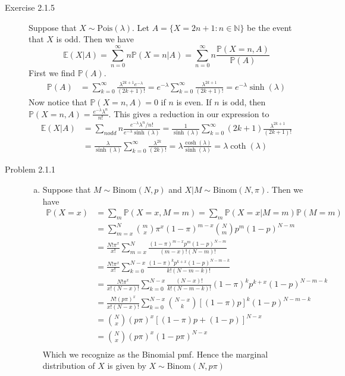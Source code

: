 \documentclass[12pt]{article}  %
\newcommand{\N}{{\mathbb{N}}}
\newcommand{\E}{{\mathbb{E}}}
\newcommand{\prob}{{\mathbb{P}}}
\begin{document}
\begin{description}
\item[Exercise 2.1.5] Suppose that $X\sim\text{Pois}(\lambda)$. Let $A = \{X = 2n+1: n\in\N\}$ be the event that $X$ is odd. Then we have $$\E(X|A) = \sum_{n=0}^{\infty}n\prob(X = n|A) = \sum_{n= 0}^{\infty}n\frac{\prob(X = n, A)}{\prob(A)}$$ First we find $\prob(A)$. 
\begin{align*}
\prob(A) &= \sum_{k=0}^{\infty}\frac{\lambda^{2k+1}e^{-\lambda}}{(2k+1)!} = e^{-\lambda}\sum_{k=0}
^{\infty}\frac{\lambda^{2k+1}}{(2k+1)!} = e^{-\lambda}\sinh(\lambda)
\end{align*}
Now notice that $\prob(X = n, A) = 0$ if $n$ is even. If $n$ is odd, then $\prob(X = n, A) = \frac{e^{-\lambda}\lambda^n}{n!}$. This gives a reduction in our expression to 
\begin{align*}
\E(X|A) &= \sum_{n odd}n\frac{e^{-\lambda}\lambda^n/n!}{e^{-\lambda}\sinh(\lambda)} = \frac{1}{\sinh(\lambda)}\sum_{k=0}^{\infty}(2k+1)\frac{\lambda^{2k+1}}{(2k+1)!}\\ 
&= \frac{\lambda}{\sinh(\lambda)}\sum_{k=0}^{\infty}\frac{\lambda^{2k}}{(2k)!} = \lambda\frac{\cosh(\lambda)}{\sinh(\lambda)} = \lambda\coth(\lambda)
\end{align*}

\item[Problem 2.1.1] 
\begin{enumerate}[(a)]
\item Suppose that $M\sim\text{Binom}(N,p)$ and $X|M\sim\text{Binom}(N,\pi)$. Then we have 
\begin{align*}
\prob(X = x) &= \sum_{m}\prob(X=x, M=m) = \sum_{m}\prob(X=x|M=m)\prob(M=m)\\
&= \sum_{m=x}^{N}\binom{m}{x}\pi^{x}(1-\pi)^{m-x}\binom{N}{m}p^m(1-p)^{N-m}\\ 
&= \frac{N!\pi^{x}}{x!}\sum_{m=x}^{N}\frac{(1-\pi)^{m-x}p^m(1-p)^{N-m}}{(m-x)!(N-m)!}\\
&= \frac{N!\pi^{x}}{x!}\sum_{k=0}^{N-x}\frac{(1-\pi)^{k}p^{k+x}(1-p)^{N-m-k}}{k!(N-m-k)!}\\
&= \frac{N!\pi^{x}}{x!(N-x)!}\sum_{k=0}^{N-x}\frac{(N-x)!}{k!(N-m-k)!}(1-\pi)^{k}p^{k+x}(1-p)^{N-m-k}\\
&= \frac{N!(p\pi)^{x}}{x!(N-x)!}\sum_{k=0}^{N-x}\binom{N-x}{k}[(1-\pi)p]^{k}(1-p)^{N-m-k}\\
&= \binom{N}{x}(p\pi)^x[(1-\pi)p + (1-p)]^{N-x}\\
&= \binom{N}{x}(p\pi)^x(1-p\pi)^{N-x}\\
\end{align*}
Which we recognize as the Binomial pmf. Hence the marginal distribution of $X$ is given by $X\sim\text{Binom}(N,p\pi)$


\end{enumerate}
\end{description}
\end{document}
